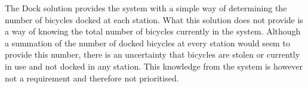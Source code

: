 The Dock solution provides the system with a simple way of determining the number of bicycles docked at each station. What this solution does not provide is a way of knowing the total number of bicycles currently in the system. Although a summation of the number of docked bicycles at every station would seem to provide this number, there is an uncertainty that bicycles are stolen or currently in use and not docked in any station. This knowledge from the system is however not a requirement and therefore not prioritised.
